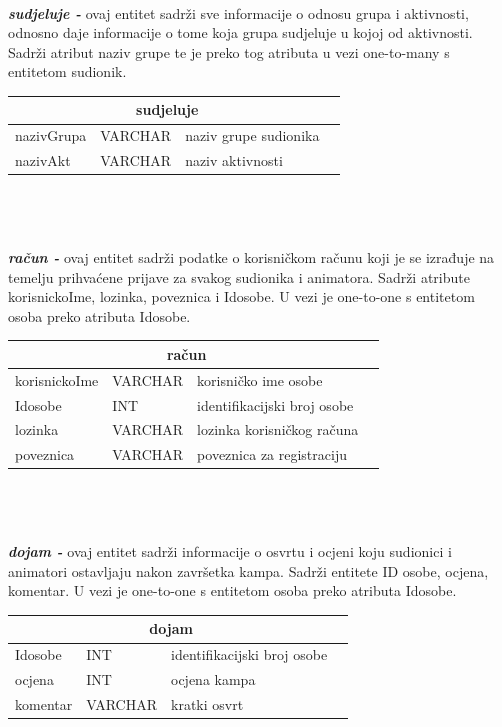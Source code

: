 \\
\textbf{\textit{sudjeluje -}} ovaj entitet sadrži sve informacije o odnosu grupa i aktivnosti, odnosno daje informacije o tome koja grupa sudjeluje u kojoj od aktivnosti. Sadrži atribut naziv grupe te je preko tog atributa u vezi one-to-many s entitetom sudionik.\\
\begin{tabular}{|l|l|l|l|}
	
	\hline \multicolumn{3}{|c|}{\textbf{sudjeluje}}\\	  \hline
	
	\cellcolor{aquamarine}nazivGrupa & VARCHAR	&  	naziv grupe sudionika\\ \hline 
	\cellcolor{aquamarine} nazivAkt	&	VARCHAR	&	naziv aktivnosti\\ \hline
\end{tabular} \\ \\
\\
\textbf{\textit{račun -}} ovaj entitet sadrži podatke o korisničkom računu koji je se izrađuje na temelju prihvaćene prijave za svakog sudionika i animatora. Sadrži atribute korisnickoIme, lozinka, poveznica i Idosobe. U vezi je one-to-one s entitetom osoba preko atributa Idosobe. \\
\begin{tabular}{|l|l|l|l|}
	
	\hline \multicolumn{3}{|c|}{\textbf{račun}}	\\  \hline
	
	\cellcolor{aquamarine}korisnickoIme & VARCHAR	&  	korisničko ime osobe\\ \hline 
	\cellcolor{blizzardblue} Idosobe	&	INT	&	identifikacijski broj osobe\\ \hline
	lozinka	&	VARCHAR	&	lozinka korisničkog računa\\ \hline
	poveznica	&	VARCHAR	&	poveznica za registraciju\\ \hline
\end{tabular} \\ \\
\\
\textbf{\textit{dojam -}} ovaj entitet sadrži informacije o osvrtu i ocjeni koju sudionici i animatori ostavljaju nakon završetka kampa. Sadrži entitete ID osobe, ocjena, komentar. U vezi je one-to-one s entitetom osoba preko atributa Idosobe.\\
\begin{tabular}{|l|l|l|l|}
	
	\hline \multicolumn{3}{|c|}{\textbf{dojam}}	\\  \hline
	
	\cellcolor{aquamarine}Idosobe	&	INT	&	identifikacijski broj osobe\\ \hline
	ocjena	&	INT	&	ocjena kampa\\ \hline
	komentar	&	VARCHAR	&	kratki osvrt\\ \hline
\end{tabular} \\ \\
